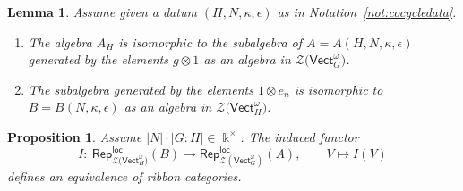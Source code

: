 \documentclass[10pt,a4paper]{amsart}
\numberwithin{equation}{section}
\newtheorem{Lemma}[Theorem]{Lemma}
\newtheorem{Proposition}[Theorem]{Proposition}
 { \theoremstyle{definition}
\newtheorem{Definition}[Theorem]{Definition}
\newtheorem{Note}[Theorem]{Note}
\newtheorem{Notation}[Theorem]{Notation}
\newtheorem{Example}[Theorem]{Example}
\newtheorem{Remark}[Theorem]{Remark} }
\newcommand{\locmod}{\mathsf{Rep}^{\mathsf{loc}}}
\newcommand{\Vect}{\mathsf{Vect}}
\newcommand{\cZ}{\mathcal{Z}}
\begin{document}
\begin{Lemma}\label{lem:AH-subalg} Assume given a datum $(H,N,\kappa,\epsilon)$ as in Notation~{\rm \ref{not:cocycledata}}.
\begin{enumerate}\itemsep=0pt
 \item[$(a)$]
The algebra $A_H$ is isomorphic to the subalgebra of $A=A(H,N,\kappa,\epsilon)$ generated by the elements $g\otimes 1$ as an algebra in $\cZ\big(\Vect_G^\omega\big)$.
\item[$(b)$]
The subalgebra generated by the elements $1\otimes e_n$ is isomorphic to $B=B(N,\kappa,\epsilon)$ as an algebra in $\cZ\big(\Vect_H^\omega\big)$.
\end{enumerate}
\end{Lemma}

\begin{Proposition}\label{prop:LocmodA}
Assume $|N|\cdot |G:H|\in \Bbbk^\times$. The induced functor
\[I\colon\ \locmod_{\cZ\big(\Vect_H^\omega\big)}(B)\to \locmod_{\cZ(\Vect_G^\omega)}(A), \qquad V\mapsto I(V)\]
defines an equivalence of ribbon categories.
\end{Proposition}
\end{document}
